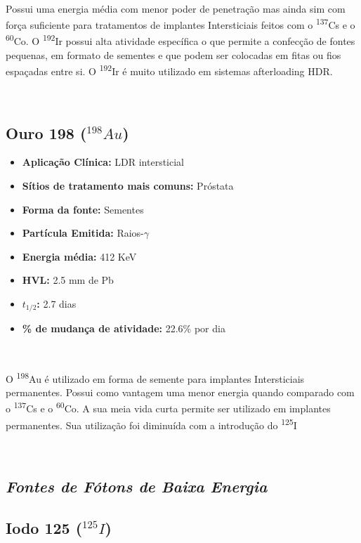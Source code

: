 \documentclass[11pt,a4paper]{article}
\begin{document}
			\

			Possui uma energia média com menor poder de penetração mas ainda sim com força suficiente para tratamentos de implantes Intersticiais feitos com o \textsuperscript{137}Cs e o \textsuperscript{60}Co. O \textsuperscript{192}Ir possui alta atividade específica o que permite a confecção de fontes pequenas, em formato de sementes e que podem ser colocadas em fitas ou fios espaçadas entre si. O \textsuperscript{192}Ir é muito utilizado em sistemas afterloading HDR.

			\

			\subsection{Ouro 198 \textbf{\textcolor{CarnationPink}{(${}^{198}Au$)}}}


			\begin{itemize}
				\item \textbf{Aplicação Clínica:} LDR intersticial
				\item \textbf{Sítios de tratamento mais comuns:} Próstata
				\item \textbf{Forma da fonte:} Sementes
				\item \textbf{Partícula Emitida:} Raios-$\gamma$
				\item \textbf{Energia média: } 412 KeV
				\item \textbf{HVL:} 2.5 mm de Pb
				\item \textbf{$t_{1/2}$:} 2.7 dias
				\item \textbf{\% de mudança de atividade: } 22.6\% por dia
			\end{itemize}

			\

			O \textsuperscript{198}Au é utilizado em forma de semente para implantes Intersticiais permanentes. Possui como vantagem uma menor energia quando comparado com o \textsuperscript{137}Cs e o \textsuperscript{60}Co. A sua meia vida curta permite ser utilizado em implantes permanentes. Sua utilização foi diminuída com a introdução do \textsuperscript{125}I

			\

		
		\subsection*{\textbf{\textit{\textcolor{CarnationPink}{Fontes de  Fótons de Baixa Energia}}}}


		\subsection{Iodo 125 \textbf{\textcolor{CarnationPink}{(${}^{125}I$)}}}
\end{document}
